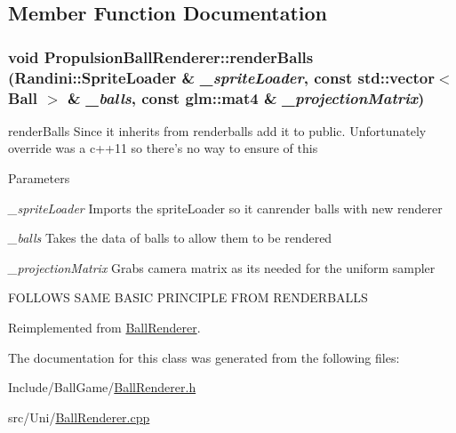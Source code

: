 \subsection{Member Function Documentation}
\hypertarget{classPropulsionBallRenderer_ad3206abdc61b39c3716eed6ed91acaa0}{
\subsubsection[{renderBalls}]{\setlength{\rightskip}{0pt plus 5cm}void PropulsionBallRenderer::renderBalls ({\bf Randini::SpriteLoader} \& {\em \_\-spriteLoader}, \/  const std::vector$<$ {\bf Ball} $>$ \& {\em \_\-balls}, \/  const glm::mat4 \& {\em \_\-projectionMatrix})}}
\label{classPropulsionBallRenderer_ad3206abdc61b39c3716eed6ed91acaa0}


renderBalls Since it inherits from renderballs add it to public. Unfortunately override was a c++11 so there's no way to ensure of this 
\begin{DoxyParams}{Parameters}
\item[{\em \_\-spriteLoader}]Imports the spriteLoader so it canrender balls with new renderer \item[{\em \_\-balls}]Takes the data of balls to allow them to be rendered \item[{\em \_\-projectionMatrix}]Grabs camera matrix as its needed for the uniform sampler \end{DoxyParams}


FOLLOWS SAME BASIC PRINCIPLE FROM RENDERBALLS 

Reimplemented from \hyperlink{classBallRenderer_a11d6402983ed53ab7f3d3353244110da}{BallRenderer}.

The documentation for this class was generated from the following files:\begin{DoxyCompactItemize}
\item 
Include/BallGame/\hyperlink{BallRenderer_8h}{BallRenderer.h}\item 
src/Uni/\hyperlink{BallRenderer_8cpp}{BallRenderer.cpp}\end{DoxyCompactItemize}
